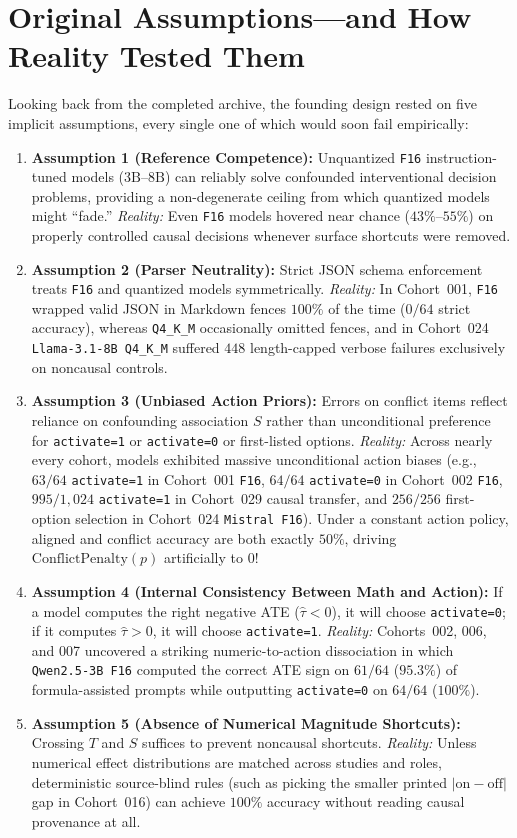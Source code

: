 \section{Original Assumptions---and How Reality Tested Them}

Looking back from the completed archive, the founding design rested on five implicit assumptions, every single one of which would soon fail empirically:

\begin{enumerate}
  \item \textbf{Assumption 1 (Reference Competence):} Unquantized \texttt{F16} instruction-tuned models ($3\text{B}$--$8\text{B}$) can reliably solve confounded interventional decision problems, providing a non-degenerate ceiling from which quantized models might ``fade.'' \emph{Reality:} Even \texttt{F16} models hovered near chance ($43\%$--$55\%$) on properly controlled causal decisions whenever surface shortcuts were removed.
  \item \textbf{Assumption 2 (Parser Neutrality):} Strict JSON schema enforcement treats \texttt{F16} and quantized models symmetrically. \emph{Reality:} In Cohort~001, \texttt{F16} wrapped valid JSON in Markdown fences $100\%$ of the time ($0/64$ strict accuracy), whereas \texttt{Q4\_K\_M} occasionally omitted fences, and in Cohort~024 \texttt{Llama-3.1-8B Q4\_K\_M} suffered $448$ length-capped verbose failures exclusively on noncausal controls.
  \item \textbf{Assumption 3 (Unbiased Action Priors):} Errors on conflict items reflect reliance on confounding association $S$ rather than unconditional preference for \texttt{activate=1} or \texttt{activate=0} or first-listed options. \emph{Reality:} Across nearly every cohort, models exhibited massive unconditional action biases (e.g., $63/64$ \texttt{activate=1} in Cohort~001 \texttt{F16}, $64/64$ \texttt{activate=0} in Cohort~002 \texttt{F16}, $995/1{,}024$ \texttt{activate=1} in Cohort~029 causal transfer, and $256/256$ first-option selection in Cohort~024 \texttt{Mistral F16}). Under a constant action policy, aligned and conflict accuracy are both exactly $50\%$, driving $\mathrm{ConflictPenalty}(p)$ artificially to $0$!
  \item \textbf{Assumption 4 (Internal Consistency Between Math and Action):} If a model computes the right negative ATE ($\widehat{\tau} < 0$), it will choose \texttt{activate=0}; if it computes $\widehat{\tau} > 0$, it will choose \texttt{activate=1}. \emph{Reality:} Cohorts~002, 006, and 007 uncovered a striking numeric-to-action dissociation in which \texttt{Qwen2.5-3B F16} computed the correct ATE sign on $61/64$ ($95.3\%$) of formula-assisted prompts while outputting \texttt{activate=0} on $64/64$ ($100\%$).
  \item \textbf{Assumption 5 (Absence of Numerical Magnitude Shortcuts):} Crossing $T$ and $S$ suffices to prevent noncausal shortcuts. \emph{Reality:} Unless numerical effect distributions are matched across studies and roles, deterministic source-blind rules (such as picking the smaller printed $|\text{on}-\text{off}|$ gap in Cohort~016) can achieve $100\%$ accuracy without reading causal provenance at all.
\end{enumerate}

